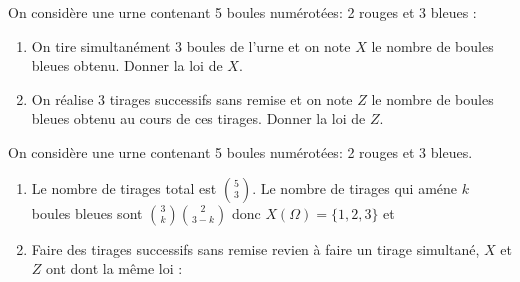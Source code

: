 \documentclass[a4paper, 11pt,reqno]{article}
\begin{document}




\begin{exercice}  \;
	On consid\`ere une urne contenant 5 boules num\'erot\'ees: 2 rouges et 3 bleues : 
	\begin{enumerate}
		\item On tire simultan\'ement 3 boules de l'urne et on note $X$ le nombre de boules bleues obtenu. Donner la loi de $X$.

		\item On r\'ealise 3 tirages successifs sans remise et on note $Z$ le nombre de boules bleues obtenu au cours de ces tirages. Donner la loi de $Z$.

	\end{enumerate}
\end{exercice}
\begin{correction}  \;
	On consid\`ere une urne contenant 5 boules num\'erot\'ees: 2 rouges et 3 bleues.
	\begin{enumerate}
		\item
  Le nombre de tirages total est $ \binom{5}{3}$. Le nombre de tirages qui améne $k$ boules bleues sont $\binom{3}{k}\binom{2}{3-k}$ 
donc $X(\Omega) = \{1,2,3\}$ et 


		\item
  Faire des tirages successifs sans remise revien à faire un tirage simultané, $X$ et $Z$ ont dont la même loi :
	\end{enumerate}
\end{correction}
\end{document}

